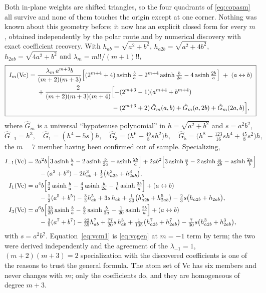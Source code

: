 \documentclass[11pt]{article}
\theoremstyle{remark}
\newcommand{\asinh}{\operatorname{asinh}}
\begin{document}
Both in-plane weights are shifted triangles, so the four quadrants of \eqref{eq:copasm}
all survive and none of them touches the origin except at one corner. Nothing was known
about this geometry before; it now has an explicit closed form for every $m$, obtained
independently by the polar route and by numerical discovery with exact coefficient
recovery. With $h_{ab} = \sqrt{a^2+b^2}$, $h_{a2b} = \sqrt{a^2+4b^2}$,
$h_{2ab} = \sqrt{4a^2+b^2}$ and $\lambda_m = m!!/(m+1)!!$,
{\small
\begin{equation}
\boxed{\;
\begin{aligned}
I_m(\text{Vc}) = {}& \frac{\lambda_m\,a^{m+3}b}{(m+2)(m+3)}\Bigl[(2^{m+4}+4)\asinh\tfrac{b}{a}
 - 2^{m+4}\asinh\tfrac{b}{2a} - 4\asinh\tfrac{2b}{a}\Bigr] \;+\; (a\leftrightarrow b)\\
&+ \frac{2}{(m+2)(m+3)(m+4)}\Bigl[-(2^{m+3}-1)(a^{m+4}+b^{m+4})\\
&\hphantom{+\frac{2}{(m+2)(m+3)(m+4)}\Bigl[}
 - (2^{m+3}+2)\,\hat G_m(a,b) + \hat G_m(a,2b) + \hat G_m(2a,b)\Bigr],
\end{aligned}\;}
\label{eq:vcgen}
\end{equation}}%
where $\hat G_m$ is a universal ``hypotenuse polynomial'' in $h = \sqrt{a^2+b^2}$ and
$s = a^2b^2$,
\begin{equation}
\hat G_{-1} = h^3,\quad
\hat G_{1} = (h^4 - 5s)h,\quad
\hat G_{3} = \bigl(h^6 - \tfrac{49}{8}s h^2\bigr)h,\quad
\hat G_{5} = \bigl(h^8 - \tfrac{123}{16}s h^4 + \tfrac{45}{8}s^2\bigr)h,
\end{equation}
the $m = 7$ member having been confirmed out of sample. Specializing,
\begin{align}
I_{-1}(\text{Vc}) &= 2a^2b\Bigl[3\asinh\tfrac{b}{a} - 2\asinh\tfrac{b}{2a} - \asinh\tfrac{2b}{a}\Bigr]
 + 2ab^2\Bigl[3\asinh\tfrac{a}{b} - 2\asinh\tfrac{a}{2b} - \asinh\tfrac{2a}{b}\Bigr]\notag\\
&\qquad - (a^3+b^3) - 2h_{ab}^3 + \tfrac{1}{3}\bigl(h_{a2b}^3 + h_{2ab}^3\bigr),
\label{eq:vcm1}\\
I_{1}(\text{Vc}) &= a^4b\Bigl[\tfrac{3}{2}\asinh\tfrac{b}{a} - \tfrac{4}{3}\asinh\tfrac{b}{2a} - \tfrac16\asinh\tfrac{2b}{a}\Bigr] + (a\leftrightarrow b)\notag\\
&\qquad - \tfrac12(a^5+b^5) - \tfrac35 h_{ab}^5 + 3s\,h_{ab} + \tfrac{1}{30}\bigl(h_{a2b}^5 + h_{2ab}^5\bigr) - \tfrac23 s\bigl(h_{a2b} + h_{2ab}\bigr),\\
I_{3}(\text{Vc}) &= a^6b\Bigl[\tfrac{33}{20}\asinh\tfrac{b}{a} - \tfrac85\asinh\tfrac{b}{2a} - \tfrac1{20}\asinh\tfrac{2b}{a}\Bigr] + (a\leftrightarrow b)\notag\\
&\qquad - \tfrac35(a^7+b^7) - \tfrac{22}{35}h_{ab}^7 + \tfrac{77}{20}s\,h_{ab}^3 + \tfrac1{105}\bigl(h_{a2b}^7 + h_{2ab}^7\bigr) - \tfrac{7}{30}s\bigl(h_{a2b}^3 + h_{2ab}^3\bigr),
\end{align}
with $s = a^2b^2$. Equation~\eqref{eq:vcm1} is \eqref{eq:vcgen} at $m = -1$ term by term;
the two were derived independently and the agreement of the $\lambda_{-1} = 1$,
$(m+2)(m+3) = 2$ specialization with the discovered coefficients is one of the reasons to
trust the general formula. The atom set of Vc has six members and never changes with $m$;
only the coefficients do, and they are homogeneous of degree $m+3$.
\end{document}
